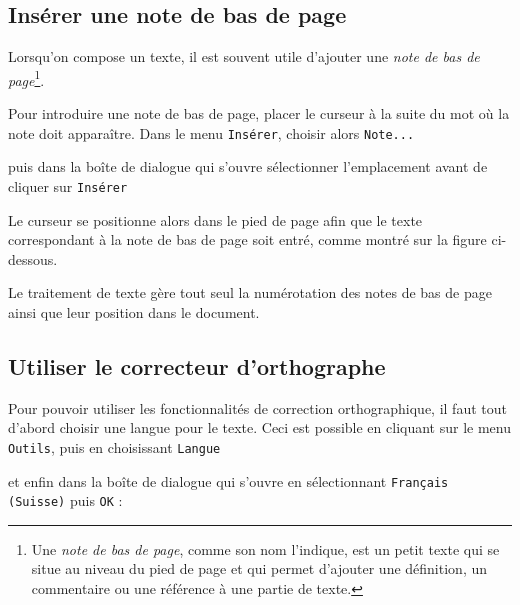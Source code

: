 \subsection{Insérer une note de bas de page}\label{Texte2NoteBasPage}

Lorsqu'on compose un texte, il est souvent utile d'ajouter une \emph{note de bas de page}\footnote{Une \emph{note de bas de page}, comme son nom l'indique, est un petit texte qui se situe au niveau du pied de page et qui permet d'ajouter une définition, un commentaire ou une référence à une partie de texte.}.

Pour introduire une note de bas de page, placer le curseur à la suite du mot où la note doit apparaître. Dans le menu \texttt{Insérer}, choisir alors \texttt{Note...}


puis dans la boîte de dialogue qui s'ouvre sélectionner l'emplacement avant de cliquer sur \texttt{Insérer}


Le curseur se positionne alors dans le pied de page afin que le texte correspondant à la note de bas de page soit entré, comme montré sur la figure ci-dessous.


Le traitement de texte gère tout seul la numérotation des notes de bas de page ainsi que leur position dans le document.




\subsection{Utiliser le correcteur d'orthographe}\label{Texte2CorrecteurOrtho}

Pour pouvoir utiliser les fonctionnalités de correction orthographique, il faut tout d'abord choisir une langue pour le texte. Ceci est possible en cliquant sur le menu \texttt{Outils}, puis en choisissant \texttt{Langue} 


et enfin dans la boîte de dialogue qui s'ouvre en sélectionnant \texttt{Français (Suisse)} puis \texttt{OK} :

